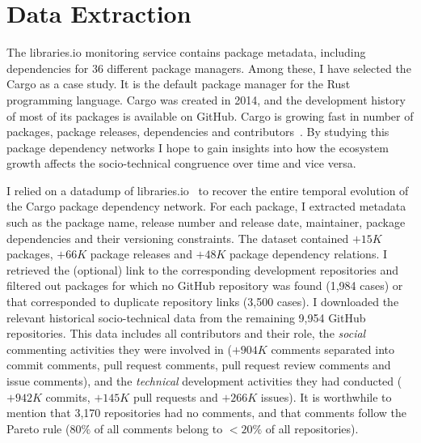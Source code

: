 \section{Data Extraction}

The \textsf{libraries.io} monitoring service contains package metadata, including dependencies for 36 different package managers.
Among these, I have selected the Cargo as a case study. It is the default package manager for %
the Rust programming language. Cargo was created in 2014, and the development history of most of its packages is available on GitHub. 
Cargo is growing fast in number of packages, package releases, dependencies and contributors~\cite{Decan2019EMSE}. 
By studying this package dependency networks I hope to gain insights into how the ecosystem growth affects the socio-technical congruence over time and vice versa.

I relied on a datadump of \textsf{libraries.io}~\cite{Katz2018} to recover the entire temporal evolution of the Cargo package dependency network. 
For each package, I extracted metadata such as the package name, release number and release date, maintainer, package dependencies and their versioning constraints. 
The dataset contained $+15K$ packages, $+66K$ package releases and $+48K$ package dependency relations.
I retrieved the (optional) link to the corresponding development repositories and filtered out packages for which no GitHub repository was found (1,984 cases) %
or that corresponded to duplicate repository links (3,500 cases).
I downloaded the relevant historical socio-technical data from the remaining 9,954 GitHub repositories.
This data includes all contributors and their role, the \emph{social} commenting activities they were involved in ($+904K$ comments separated into commit comments, pull request comments, pull request review comments and issue comments), and the \emph{technical} development activities they had conducted ($+942K$ commits, $+145K$ pull requests and $+266K$ issues).
It is worthwhile to mention that 3,170 repositories had no comments, and that comments follow the Pareto rule ($80\%$ of all comments belong to $<20\%$ of all repositories).